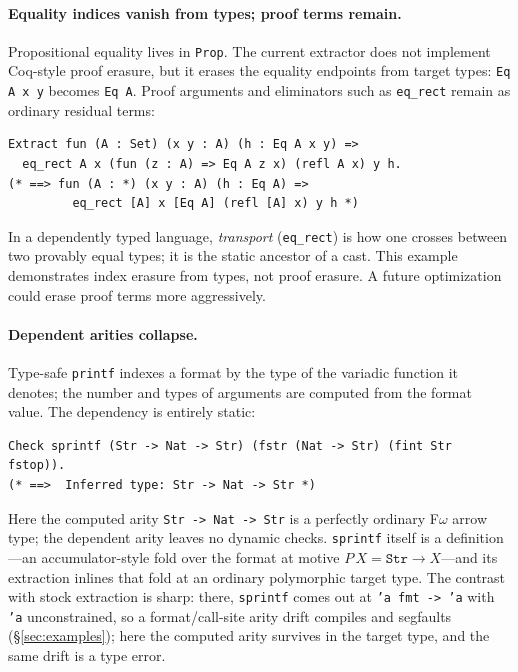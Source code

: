 \documentclass[acmsmall,anonymous=false,nonacm]{acmart}
\begin{document}
\paragraph{Equality indices vanish from types; proof terms remain.}
Propositional equality lives in \texttt{Prop}. The current extractor does not
implement Coq-style proof erasure, but it erases the equality endpoints from
target types: \texttt{Eq A x y} becomes \texttt{Eq A}. Proof arguments and
eliminators such as \texttt{eq\_rect} remain as ordinary residual terms:
\begin{lstlisting}
Extract fun (A : Set) (x y : A) (h : Eq A x y) =>
  eq_rect A x (fun (z : A) => Eq A z x) (refl A x) y h.
(* ==> fun (A : *) (x y : A) (h : Eq A) =>
         eq_rect [A] x [Eq A] (refl [A] x) y h *)
\end{lstlisting}
In a dependently typed language, \emph{transport} (\texttt{eq\_rect}) is how one
crosses between two provably equal types; it is the static ancestor of a cast.
This example demonstrates index erasure from types, not proof erasure.
A future optimization could erase proof terms more aggressively.

\paragraph{Dependent arities collapse.}
Type-safe \texttt{printf} indexes a format by the type of the variadic function
it denotes; the number and types of arguments are computed from the format
value. The dependency is entirely static:
\begin{lstlisting}
Check sprintf (Str -> Nat -> Str) (fstr (Nat -> Str) (fint Str fstop)).
(* ==>  Inferred type: Str -> Nat -> Str *)
\end{lstlisting}
Here the computed arity \texttt{Str -> Nat -> Str} is a perfectly ordinary
F$\omega$ arrow type; the dependent arity leaves no dynamic checks.
\texttt{sprintf} itself is a definition---an accumulator-style fold over the
format at motive $P\,X = \texttt{Str} \to X$---and its extraction inlines
that fold at an ordinary polymorphic target type.  The contrast with stock
extraction is sharp: there, \texttt{sprintf} comes out at \texttt{'a fmt ->
'a} with \texttt{'a} unconstrained, so a format/call-site arity drift
compiles and segfaults (\S\ref{sec:examples}); here the computed arity
survives in the target type, and the same drift is a type error.
\end{document}
